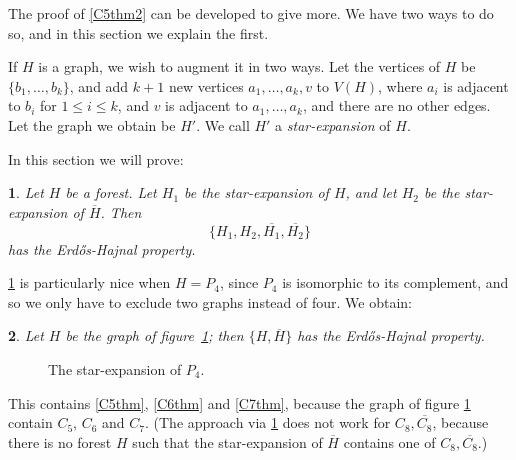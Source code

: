 \documentclass[titlepage,11pt]{article}
\def\ll{,\ldots,}
\newtheorem{thm}{}[section]
\begin{document}
The proof of \ref{C5thm2} can be developed to give more. 
We have two ways to do so, and in this section we explain the first.

If $H$ is a graph, we wish to augment it in two ways. Let the vertices of $H$ be $\{b_1\ll b_k\}$, and add $k+1$ 
new vertices $a_1\ll a_k,v$ to $V(H)$, where $a_i$ is adjacent to $b_i$ for $1\le i\le k$, and $v$ is adjacent to
$a_1\ll a_k$, and there are no other edges. Let the graph we obtain be $H'$. 
We call $H'$ a {\em star-expansion} of $H$.

In this section we will prove:
\begin{thm}\label{treeext}
Let $H$ be a forest. Let $H_1$ be the star-expansion of $H$, and let $H_2$
be the star-expansion of $\overline{H}$. Then 
$$\{H_1,H_2,\overline{H_1},\overline{H_2}\}$$
has the Erd\H os-Hajnal property.
\end{thm}

\ref{treeext} is particularly nice when $H=P_4$, since $P_4$ is isomorphic to its complement, and so we only have to exclude two 
graphs instead of four. We obtain:
\begin{thm}\label{twoleaves}
Let $H$ be the graph of figure~\ref{fig:P4expansion}; then $\{H,\overline{H}\}$ has the Erd\H os-Hajnal property.
\end{thm}


\begin{figure}[ht]
\centering


\caption{The star-expansion of $P_4$.} \label{fig:P4expansion}
\end{figure}

This contains \ref{C5thm}, 
\ref{C6thm} and \ref{C7thm}, because the graph of figure \ref{fig:P4expansion}
contain $C_5$, $C_6$ and $C_7$. (The approach via \ref{treeext} does not work for $C_8,\overline{C_8}$,
because there is no forest $H$ such that the star-expansion
of $\overline{H}$ contains one of $C_8,\overline{C_8}$.)
\end{document}
